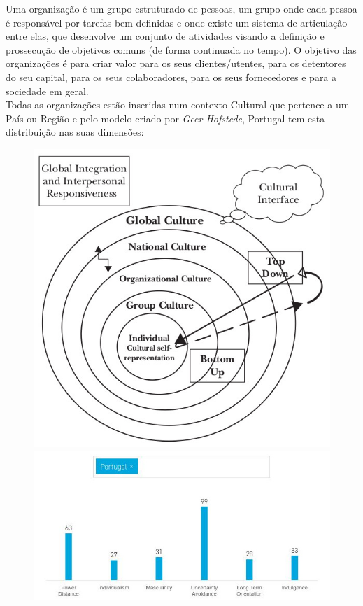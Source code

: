{Uma organização é um grupo estruturado de pessoas, um grupo onde cada pessoa é responsável por tarefas bem definidas e onde existe um sistema de articulação entre elas, que desenvolve um conjunto de atividades visando a definição e prossecução de objetivos comuns (de forma continuada no tempo). O objetivo das organizações é para criar valor para os seus clientes/utentes, para os detentores do seu capital, para os seus colaboradores, para os seus fornecedores e para a sociedade em geral.\\




\newpage
Todas as organizações estão inseridas num contexto Cultural que pertence a um País ou Região e pelo modelo criado por \textit{Geer Hofstede}, Portugal tem esta distribuição nas suas dimensões:
\begin{figure}[H]
\begin{minipage}{0.3\linewidth}
\flushleft
\includegraphics[scale=0.30]{./image/OB/OB_MUltilevelmodelCulture.jpg}
\end{minipage}
\hspace{1cm}
\begin{minipage}{0.4\linewidth}
\flushleft
\includegraphics[scale=0.44]{./image/OB/Hofstede_pt}

\end{minipage}
\end{figure}}
